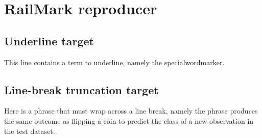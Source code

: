 \documentclass[12pt]{article}
\begin{document}
\section*{RailMark reproducer}

\subsection*{Underline target}

This line contains a term to underline, namely the specialwordmarker.

\subsection*{Line-break truncation target}

Here is a phrase that must wrap across a line break, namely the phrase produces the same outcome as flipping a coin to predict the class of a new observation in the test dataset.
\end{document}
